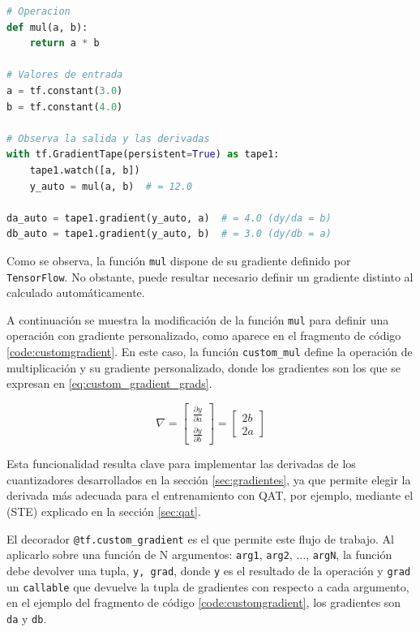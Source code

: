 \newpage
\begin{lstlisting}[language=Python,label=code:mul,caption=Definición de la operación mul (gradiente automático) en TensorFlow.]
# Operacion
def mul(a, b):
    return a * b

# Valores de entrada
a = tf.constant(3.0)
b = tf.constant(4.0)

# Observa la salida y las derivadas
with tf.GradientTape(persistent=True) as tape1:
    tape1.watch([a, b])
    y_auto = mul(a, b)  # = 12.0

da_auto = tape1.gradient(y_auto, a)  # = 4.0 (dy/da = b)
db_auto = tape1.gradient(y_auto, b)  # = 3.0 (dy/db = a)
\end{lstlisting}

Como se observa, la función \texttt{mul} dispone de su gradiente definido por \texttt{TensorFlow}. No obstante, puede resultar necesario definir un gradiente distinto al calculado automáticamente.

A continuación se muestra la modificación de la función \texttt{mul} para definir una operación con gradiente personalizado, como aparece en el fragmento de código \ref{code:customgradient}. En este caso, la función \texttt{custom\_mul} define la operación de multiplicación y su gradiente personalizado, donde los gradientes son los que se expresan en \ref{eq:custom_gradient_grads}.

\begin{equation}
\label{eq:custom_gradient_grads}
\nabla = \begin{bmatrix} \frac{\partial y}{\partial a} \\ \frac{\partial y}{\partial b} \end{bmatrix} = \begin{bmatrix} 2b \\ 2a \end{bmatrix}
\end{equation}

Esta funcionalidad resulta clave para implementar las derivadas de los cuantizadores desarrollados en la sección \ref{sec:gradientes}, ya que permite elegir la derivada más adecuada para el entrenamiento con QAT, por ejemplo, mediante el (STE) explicado en la sección \ref{sec:qat}.

El decorador \cite{pep318} \texttt{@tf.custom\_gradient} \cite{tensorflow_custom_gradient} es el que permite este flujo de trabajo. Al aplicarlo sobre una función de N argumentos: \texttt{arg1}, \texttt{arg2}, $\ldots$, \texttt{argN}, la función debe devolver una tupla, \texttt{y, grad}, donde \texttt{y} es el resultado de la operación y \texttt{grad} un \texttt{callable} \cite{python_callable} que devuelve la tupla \cite{python_datastructures} de gradientes con respecto a cada argumento, en el ejemplo del fragmento de código \ref{code:customgradient}, los gradientes son \texttt{da} y \texttt{db}.

